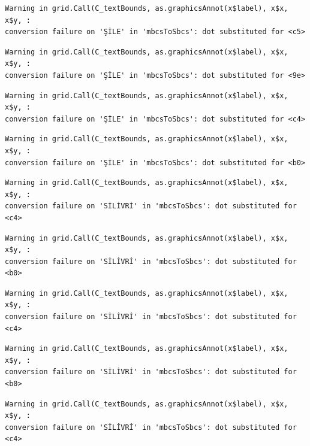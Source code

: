 \documentclass[
  11pt,
  a4paper,
  DIV=11,
  numbers=noendperiod]{scrartcl}
\begin{document}
\begin{verbatim}
Warning in grid.Call(C_textBounds, as.graphicsAnnot(x$label), x$x, x$y, :
conversion failure on 'ŞİLE' in 'mbcsToSbcs': dot substituted for <c5>
\end{verbatim}

\begin{verbatim}
Warning in grid.Call(C_textBounds, as.graphicsAnnot(x$label), x$x, x$y, :
conversion failure on 'ŞİLE' in 'mbcsToSbcs': dot substituted for <9e>
\end{verbatim}

\begin{verbatim}
Warning in grid.Call(C_textBounds, as.graphicsAnnot(x$label), x$x, x$y, :
conversion failure on 'ŞİLE' in 'mbcsToSbcs': dot substituted for <c4>
\end{verbatim}

\begin{verbatim}
Warning in grid.Call(C_textBounds, as.graphicsAnnot(x$label), x$x, x$y, :
conversion failure on 'ŞİLE' in 'mbcsToSbcs': dot substituted for <b0>
\end{verbatim}

\begin{verbatim}
Warning in grid.Call(C_textBounds, as.graphicsAnnot(x$label), x$x, x$y, :
conversion failure on 'SİLİVRİ' in 'mbcsToSbcs': dot substituted for <c4>
\end{verbatim}

\begin{verbatim}
Warning in grid.Call(C_textBounds, as.graphicsAnnot(x$label), x$x, x$y, :
conversion failure on 'SİLİVRİ' in 'mbcsToSbcs': dot substituted for <b0>
\end{verbatim}

\begin{verbatim}
Warning in grid.Call(C_textBounds, as.graphicsAnnot(x$label), x$x, x$y, :
conversion failure on 'SİLİVRİ' in 'mbcsToSbcs': dot substituted for <c4>
\end{verbatim}

\begin{verbatim}
Warning in grid.Call(C_textBounds, as.graphicsAnnot(x$label), x$x, x$y, :
conversion failure on 'SİLİVRİ' in 'mbcsToSbcs': dot substituted for <b0>
\end{verbatim}

\begin{verbatim}
Warning in grid.Call(C_textBounds, as.graphicsAnnot(x$label), x$x, x$y, :
conversion failure on 'SİLİVRİ' in 'mbcsToSbcs': dot substituted for <c4>
\end{verbatim}
\end{document}
